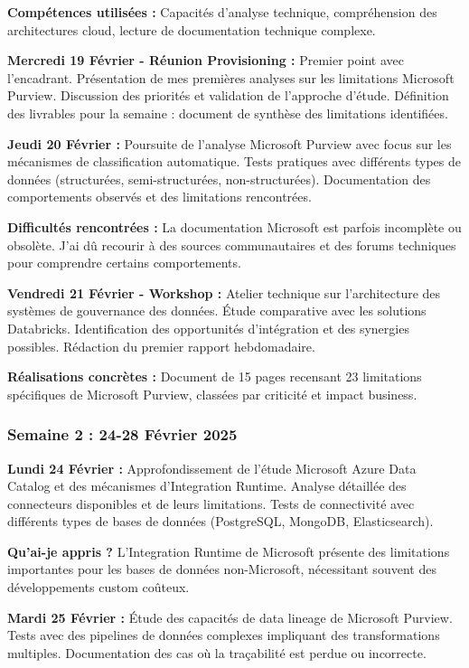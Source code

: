 \documentclass[a4paper,12pt]{article}
\begin{document}
\textbf{Compétences utilisées :} Capacités d'analyse technique, compréhension des architectures cloud, lecture de documentation technique complexe.

\textbf{Mercredi 19 Février - Réunion Provisioning :}
Premier point avec l'encadrant. Présentation de mes premières analyses sur les limitations Microsoft Purview. Discussion des priorités et validation de l'approche d'étude. Définition des livrables pour la semaine : document de synthèse des limitations identifiées.

\textbf{Jeudi 20 Février :}
Poursuite de l'analyse Microsoft Purview avec focus sur les mécanismes de classification automatique. Tests pratiques avec différents types de données (structurées, semi-structurées, non-structurées). Documentation des comportements observés et des limitations rencontrées.

\textbf{Difficultés rencontrées :} La documentation Microsoft est parfois incomplète ou obsolète. J'ai dû recourir à des sources communautaires et des forums techniques pour comprendre certains comportements.

\textbf{Vendredi 21 Février - Workshop :}
Atelier technique sur l'architecture des systèmes de gouvernance des données. Étude comparative avec les solutions Databricks. Identification des opportunités d'intégration et des synergies possibles. Rédaction du premier rapport hebdomadaire.

\textbf{Réalisations concrètes :} Document de 15 pages recensant 23 limitations spécifiques de Microsoft Purview, classées par criticité et impact business.

\subsubsection{Semaine 2 : 24-28 Février 2025}

\textbf{Lundi 24 Février :}
Approfondissement de l'étude Microsoft Azure Data Catalog et des mécanismes d'Integration Runtime. Analyse détaillée des connecteurs disponibles et de leurs limitations. Tests de connectivité avec différents types de bases de données (PostgreSQL, MongoDB, Elasticsearch).

\textbf{Qu'ai-je appris ?} L'Integration Runtime de Microsoft présente des limitations importantes pour les bases de données non-Microsoft, nécessitant souvent des développements custom coûteux.

\textbf{Mardi 25 Février :}
Étude des capacités de data lineage de Microsoft Purview. Tests avec des pipelines de données complexes impliquant des transformations multiples. Documentation des cas où la traçabilité est perdue ou incorrecte.
\end{document}
